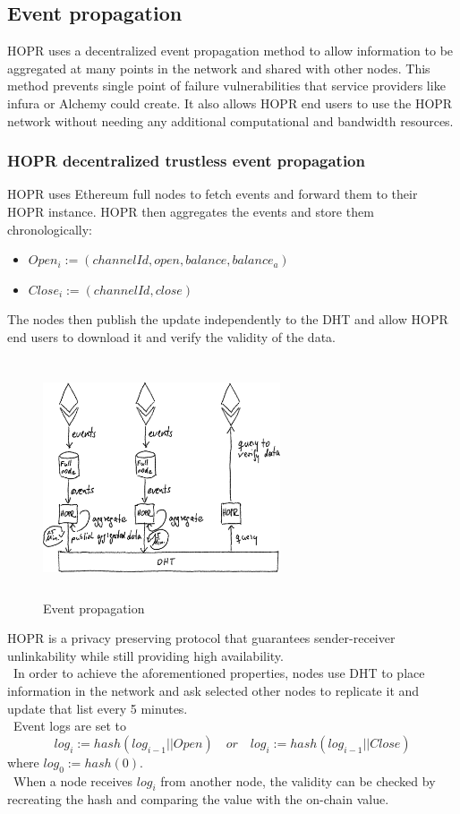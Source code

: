 \subsection{Event propagation}
HOPR uses a decentralized event propagation method to allow information to be aggregated at many points in the network and shared with other nodes. 
This method prevents single point of failure vulnerabilities that service providers like infura or Alchemy could create. 
It also allows HOPR end users to use the HOPR network without needing any additional computational and bandwidth resources.  
\subsubsection*{HOPR decentralized trustless event propagation} 
HOPR uses Ethereum full nodes to fetch events and forward them to their HOPR instance. 
HOPR then aggregates the events and store them chronologically:
\begin{itemize}
    \item $Open_i:=(channelId, open, balance, balance_a)$
    \item $Close_i:=(channelId, close)$
\end{itemize}
The nodes then publish the update independently to the DHT and allow HOPR end users to download it and verify the validity of the data.
\begin{figure}[H]
    \centering
    \includegraphics[width=7cm,height=7cm,keepaspectratio]{../whitepaper/images/event_propagation.png}
    \caption{Event propagation}
    \label{fig:Event propagation}
\end{figure}
\hspace{-5mm}HOPR is a privacy preserving protocol that guarantees sender-receiver unlinkability while still providing high availability.
\\~In order to achieve the aforementioned properties, nodes use DHT to place information in the network and ask selected other nodes to replicate it and update that list every 5 minutes. 
\\~Event logs are set to $$log_i:=hash( log_{i-1}|| Open) \quad or \quad log_i:=hash( log_{i-1}|| Close )$$ where $log_0:=hash(0)$.
\\~When a node receives $log_i$ from another node, the validity can be checked by recreating the hash and comparing the value with the on-chain value.






